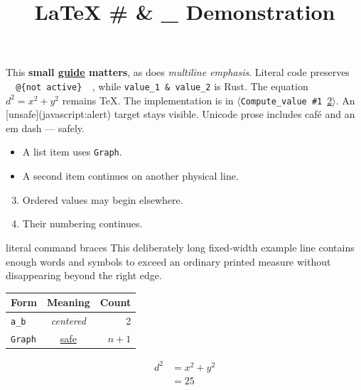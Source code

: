 \documentclass[12pt]{article}
\title{LaTeX \# \& \_ Demonstration}
\author{}
\date{}
\begin{document}
\maketitle
\LitwebMiniIndexBegin
{}
\par This \textbf{small \href{\detokenize{https://example.com/a_b?x=1&y=2}}{guide}
matters}, as does \emph{multiline
emphasis}. Literal code preserves \texttt{\ \ @\{not\ active\}\ \ }, while
\texttt{value\_1\ \&\ value\_2} is Rust. The equation \(d^2 = x^2 + y^2\) remains TeX.
The implementation is in \(\langle\)\texttt{Compute\_value\ \#1}\ \hyperlink{litweb-1-2}{2}\(\rangle\). An [unsafe](javascript:alert)
target stays visible. Unicode prose includes café and an em dash — safely.

\begin{itemize}
\item A list item uses \texttt{Graph}.
\item A second item continues
on another physical line.
\end{itemize}
\begin{enumerate}
\setcounter{enumi}{2}
\item Ordered values may begin elsewhere.
\item Their numbering continues.
\end{enumerate}
\begin{LitwebCode}
literal \LitwebBackslash{}command \LitwebLeftBrace{} braces \LitwebRightBrace{} %
This deliberately long fixed-width example line contains enough words and symbols to exceed an ordinary printed measure without disappearing beyond the right edge.
\end{LitwebCode}
\begin{center}
\nobreak
\begin{tabularx}{\linewidth}{LCR}
\toprule
Form & Meaning & Count \\
\midrule
\texttt{a\_b} & \emph{centered} & 2 \\
\texttt{Graph} & \href{\detokenize{guide.html}}{safe} & \(n+1\) \\
\bottomrule
\end{tabularx}
\end{center}
\[
\begin{aligned}
d^2 &= x^2 + y^2 \\
    &= 25
\end{aligned}
\]
\end{document}
